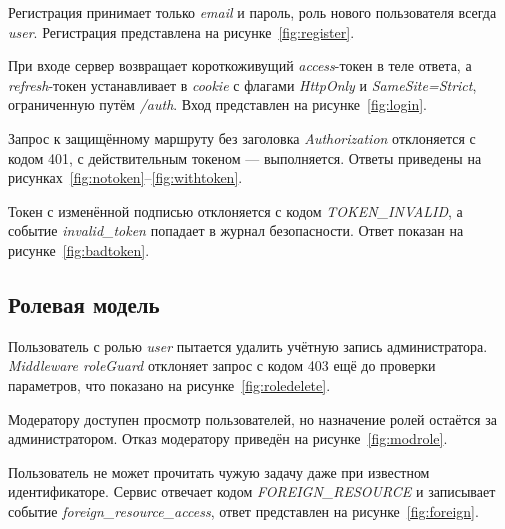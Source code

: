 \documentclass{stp}
\begin{document}
Регистрация принимает только \textit{email} и пароль, роль нового пользователя
всегда \textit{user}. Регистрация представлена на рисунке~\ref{fig:register}.


При входе сервер возвращает короткоживущий \textit{access}-токен в теле ответа,
а \textit{refresh}-токен устанавливает в \textit{cookie} с флагами \textit{HttpOnly} и
\textit{SameSite=Strict}, ограниченную путём \textit{/auth}. Вход представлен на
рисунке~\ref{fig:login}.


Запрос к защищённому маршруту без заголовка \textit{Authorization} отклоняется с
кодом 401, с действительным токеном — выполняется. Ответы приведены на
рисунках~\ref{fig:notoken}--\ref{fig:withtoken}.



Токен с изменённой подписью отклоняется с кодом \textit{TOKEN\_INVALID}, а
событие \textit{invalid\_token} попадает в журнал безопасности. Ответ показан на
рисунке~\ref{fig:badtoken}.


\subsection{Ролевая модель}

Пользователь с ролью \textit{user} пытается удалить учётную запись
администратора. \textit{Middleware roleGuard} отклоняет запрос с кодом 403 ещё
до проверки параметров, что показано на рисунке~\ref{fig:roledelete}.


Модератору доступен просмотр пользователей, но назначение ролей
остаётся за администратором. Отказ модератору приведён на
рисунке~\ref{fig:modrole}.


Пользователь не может прочитать чужую задачу даже при известном
идентификаторе. Сервис отвечает кодом \textit{FOREIGN\_RESOURCE} и записывает
событие \textit{foreign\_resource\_access}, ответ представлен на
рисунке~\ref{fig:foreign}.
\end{document}

